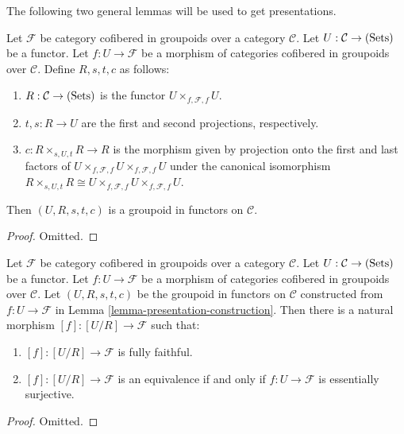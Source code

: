 \noindent
The following two general lemmas will be used to get presentations.

\begin{lemma}
\label{lemma-presentation-construction}
Let $\mathcal F$ be category cofibered in groupoids over a category $\mathcal 
C$.  Let $U: \mathcal C \rightarrow \textnormal{(Sets)}$ be a functor. Let $f: 
U \rightarrow \mathcal F$ be a morphism of categories cofibered in groupoids 
over $\mathcal C$. Define $R,s,t,c$ as follows:
\begin{enumerate}
\item $R: \mathcal C \rightarrow \textnormal{(Sets)}$ is the functor $U 
\times_{f,\mathcal F,f} U$.
\item $t,s: R \rightarrow U$ are the first and second projections, 
respectively. 
\item $c: R \times_{s,U,t} R \rightarrow R$ is the morphism given by projection 
onto the first and last factors of $U \times_{f, \mathcal F, f} U 
\times_{f,\mathcal F,f} U$ under the canonical isomorphism $R \times_{s,U,t} R 
\cong U \times_{f, \mathcal F, f} U \times_{f,\mathcal F,f} U$.
\end{enumerate}
Then $(U,R,s,t,c)$ is a groupoid in functors on $\mathcal C$.
\end{lemma}

\begin{proof}
Omitted.
\end{proof}

\begin{lemma}
\label{lemma-presentation-morphism}
Let $\mathcal F$ be category cofibered in groupoids over a category $\mathcal 
C$.  Let $U: \mathcal C \rightarrow \textnormal{(Sets)}$ be a functor. Let $f: 
U \rightarrow \mathcal F$ be a morphism of categories cofibered in groupoids 
over $\mathcal C$. Let $(U,R,s,t,c)$ be the groupoid in functors on $\mathcal 
C$ constructed from $f: U \rightarrow \mathcal F$ in Lemma 
\ref{lemma-presentation-construction}.  Then there is a natural morphism $[f]: 
[U/R] \rightarrow \mathcal F$ such that:
\begin{enumerate}
\item $[f]: [U/R] \rightarrow \mathcal F$ is fully faithful.
\item $[f]: [U/R] \rightarrow \mathcal F$ is an equivalence if and only if $f: 
U \rightarrow \mathcal F$ is essentially surjective.
\end{enumerate}
\end{lemma}

\begin{proof}
Omitted.
\end{proof}


